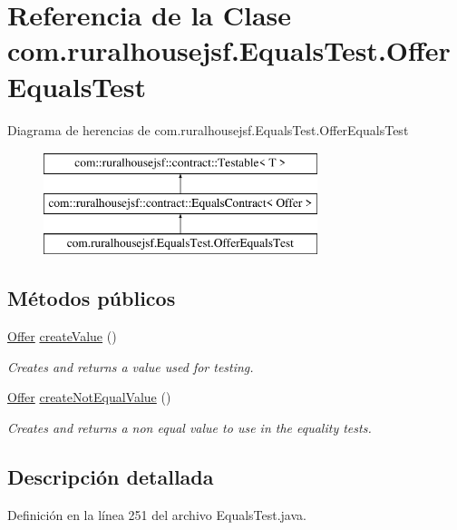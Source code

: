 \hypertarget{a00260}{}\section{Referencia de la Clase com.\+ruralhousejsf.\+Equals\+Test.\+Offer\+Equals\+Test}
\label{a00260}
Diagrama de herencias de com.\+ruralhousejsf.\+Equals\+Test.\+Offer\+Equals\+Test\begin{figure}[H]
\begin{center}
\leavevmode
\includegraphics[height=3.000000cm]{a00260}
\end{center}
\end{figure}
\subsection*{Métodos públicos}
\begin{DoxyCompactItemize}
\item 
\mbox{\hyperlink{a00184}{Offer}} \mbox{\hyperlink{a00260_a25524d0ab8278899774751c0f7630e8d}{create\+Value}} ()
\begin{DoxyCompactList}\small\item\em Creates and returns a value used for testing. \end{DoxyCompactList}\item 
\mbox{\hyperlink{a00184}{Offer}} \mbox{\hyperlink{a00260_a459de0dbb86bdaa6f54b99eb887a2eab}{create\+Not\+Equal\+Value}} ()
\begin{DoxyCompactList}\small\item\em Creates and returns a non equal value to use in the equality tests. \end{DoxyCompactList}\end{DoxyCompactItemize}


\subsection{Descripción detallada}


Definición en la línea 251 del archivo Equals\+Test.\+java.



